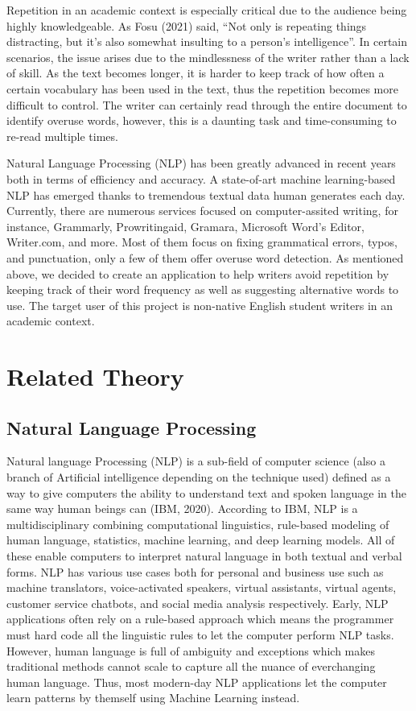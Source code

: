 \documentclass[12pt,oneside,openright,a4paper]{cpe-english-project}
\begin{document}
Repetition in an academic context is especially critical due to the audience being highly knowledgeable. As Fosu (2021) said, “Not only is repeating things distracting, but it’s also somewhat insulting to a person’s intelligence”. In certain scenarios, the issue arises due to the mindlessness of the writer rather than a lack of skill. As the text becomes longer, it is harder to keep track of how often a certain vocabulary has been used in the text, thus the repetition becomes more difficult to control. The writer can certainly read through the entire document to identify overuse words, however, this is a daunting task and time-consuming to re-read multiple times.

Natural Language Processing (NLP) has been greatly advanced in recent years both in terms of efficiency and accuracy. A state-of-art machine learning-based NLP has emerged thanks to tremendous textual data human generates each day. Currently, there are numerous services focused on computer-assited writing, for instance, Grammarly, Prowritingaid, Gramara, Microsoft Word’s Editor, Writer.com, and more. Most of them focus on fixing grammatical errors, typos, and punctuation, only a few of them offer overuse word detection. As mentioned above, we decided to create an application to help writers avoid repetition by keeping track of their word frequency as well as suggesting alternative words to use. The target user of this project is non-native English student writers in an academic context.
\section{Related Theory}
\subsection{Natural Language Processing}
Natural language Processing (NLP) is a sub-field of computer science (also a branch of Artificial intelligence depending on the technique used) defined as a way to give computers the ability to understand text and spoken language in the same way human beings can (IBM, 2020). According to IBM,  NLP is a multidisciplinary combining computational linguistics, rule-based modeling of human language, statistics, machine learning, and deep learning models. All of these enable computers to interpret natural language in both textual and verbal forms.  NLP has various use cases both for personal and business use such as machine translators, voice-activated speakers, virtual assistants, virtual agents, customer service chatbots, and social media analysis respectively. Early, NLP applications often rely on a rule-based approach which means the programmer must hard code all the linguistic rules to let the computer perform NLP tasks. However, human language is full of ambiguity and exceptions which makes traditional methods cannot scale to capture all the nuance of everchanging human language. Thus, most modern-day NLP applications let the computer learn patterns by themself using Machine Learning instead.
\end{document}
